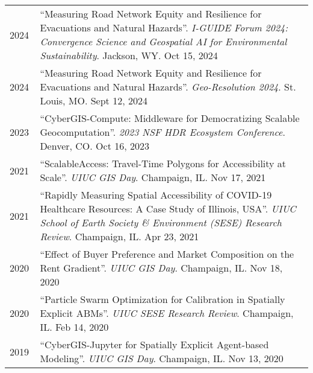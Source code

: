 \documentclass{acmcv}
\begin{document}
    \begin{longtable}{p{0.1\linewidth} p{0.9\linewidth}}
        2024 & ``Measuring Road Network Equity and Resilience for Evacuations and Natural Hazards''. \textit{I-GUIDE Forum 2024: Convergence Science and Geospatial AI for Environmental Sustainability}. Jackson, WY. Oct 15, 2024 \\

        2024 & ``Measuring Road Network Equity and Resilience for Evacuations and Natural Hazards''. \textit{Geo-Resolution 2024}. St. Louis, MO. Sept 12, 2024 \\

        2023 & ``CyberGIS-Compute: Middleware for Democratizing Scalable Geocomputation''. \textit{2023 NSF HDR Ecosystem Conference}. Denver, CO. Oct 16, 2023 \\

        2021 & ``ScalableAccess: Travel-Time Polygons for Accessibility at Scale''. \textit{UIUC GIS Day}. Champaign, IL. Nov 17, 2021 \\

        2021 & ``Rapidly Measuring Spatial Accessibility of COVID-19 Healthcare Resources: A Case Study of Illinois, USA''. \textit{UIUC School of Earth Society \& Environment (SESE) Research Review}. Champaign, IL. Apr 23, 2021 \\ 

        2020 & ``Effect of Buyer Preference and Market Composition on the Rent Gradient''. \textit{UIUC GIS Day}. Champaign, IL. Nov 18, 2020 \\

        2020 & ``Particle Swarm Optimization for Calibration in Spatially Explicit ABMs''. \textit{UIUC SESE Research Review}. Champaign, IL. Feb 14, 2020 \\ 

        2019 & ``CyberGIS-Jupyter for Spatially Explicit Agent-based Modeling''. \textit{UIUC GIS Day}. Champaign, IL. Nov 13, 2020 \\

    \end{longtable}


\end{document}
